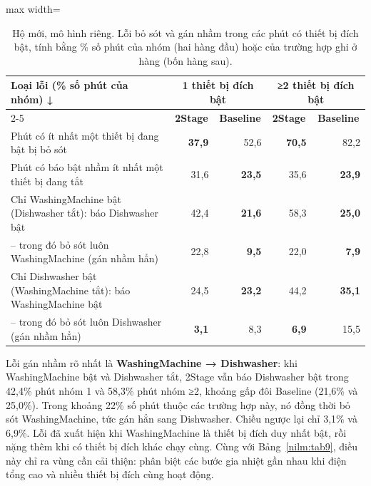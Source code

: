\begin{table}[H]
\centering
\caption{Hộ mới, mô hình riêng. Lỗi bỏ sót và gán nhầm trong các phút có thiết bị đích bật, tính bằng \% số phút của nhóm (hai hàng đầu) hoặc của trường hợp ghi ở hàng (bốn hàng sau).}\label{nilm:tab10}
\footnotesize
\setlength{\tabcolsep}{3.5pt}\renewcommand{\arraystretch}{1.12}
\begin{adjustbox}{max width=\linewidth}
\begin{tabular}{|l|r|r|r|r|}
\hline
\multirow{2}{*}{\textbf{Loại lỗi (\% số phút của nhóm) ↓}} & \multicolumn{2}{c|}{\textbf{1 thiết bị đích bật}} & \multicolumn{2}{c|}{\textbf{≥2 thiết bị đích bật}} \\ \cline{2-5}
 & \multicolumn{1}{c|}{\textbf{2Stage}} & \multicolumn{1}{c|}{\textbf{Baseline}} & \multicolumn{1}{c|}{\textbf{2Stage}} & \multicolumn{1}{c|}{\textbf{Baseline}} \\ \hline
Phút có ít nhất một thiết bị đang bật bị bỏ sót & \textbf{37,9} & 52,6 & \textbf{70,5} & 82,2 \\ \hline
Phút có báo bật nhầm ít nhất một thiết bị đang tắt & 31,6 & \textbf{23,5} & 35,6 & \textbf{23,9} \\ \hline
Chỉ WashingMachine bật (Dishwasher tắt): báo Dishwasher bật & 42,4 & \textbf{21,6} & 58,3 & \textbf{25,0} \\ \hline
– trong đó bỏ sót luôn WashingMachine (gán nhầm hẳn) & 22,8 & \textbf{9,5} & 22,0 & \textbf{7,9} \\ \hline
Chỉ Dishwasher bật (WashingMachine tắt): báo WashingMachine bật & 24,5 & \textbf{23,2} & 44,2 & \textbf{35,1} \\ \hline
– trong đó bỏ sót luôn Dishwasher (gán nhầm hẳn) & \textbf{3,1} & 8,3 & \textbf{6,9} & 15,5 \\ \hline
\end{tabular}
\end{adjustbox}
\end{table}

Lỗi gán nhầm rõ nhất là \textbf{WashingMachine → Dishwasher}: khi WashingMachine bật và Dishwasher tắt, 2Stage vẫn báo Dishwasher bật trong 42,4\% phút nhóm 1 và 58,3\% phút nhóm ≥2, khoảng gấp đôi Baseline (21,6\% và 25,0\%). Trong khoảng 22\% số phút thuộc các trường hợp này, nó đồng thời bỏ sót WashingMachine, tức gán hẳn sang Dishwasher. Chiều ngược lại chỉ 3,1\% và 6,9\%. Lỗi đã xuất hiện khi WashingMachine là thiết bị đích duy nhất bật, rồi nặng thêm khi có thiết bị đích khác chạy cùng. Cùng với Bảng~\ref{nilm:tab9}, điều này chỉ ra vùng cần cải thiện: phân biệt các bước gia nhiệt gần nhau khi điện tổng cao và nhiều thiết bị đích cùng hoạt động.


